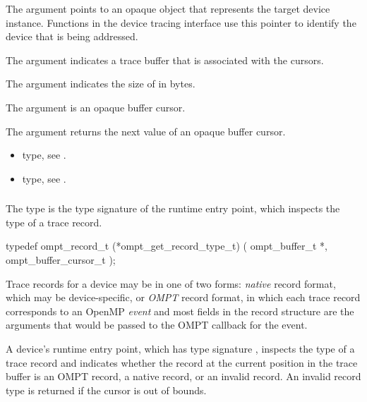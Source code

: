 \argdesc
The  argument points to an opaque object that represents
the target device instance. Functions in the device tracing interface
use this pointer to identify the device that is being addressed.

The  argument indicates a trace buffer that is associated
with the cursors.

The argument  indicates the size of  in bytes.

The  argument is an opaque buffer cursor.

The  argument returns the next value of an opaque buffer cursor.

\crossreferences
\begin{itemize}
\item {} type, see .

\item {} type, see .
\end{itemize}



\subsubsection{}
\label{sec:ompt_get_record_type_t}

\summary
The  type is the type signature of the 
 runtime entry point, which inspects the 
type of a trace record.

\format
\begin{ccppspecific}
\begin{omptInquiry}
typedef ompt_record_t (*ompt_get_record_type_t) (
  ompt_buffer_t *,
  ompt_buffer_cursor_t 
);
\end{omptInquiry}
\end{ccppspecific}

\descr
Trace records for a device may be in one of two forms: \emph{native} 
record format, which may be device-specific, or \emph{OMPT} record 
format, in which each trace record corresponds to an OpenMP \emph{event} 
and most fields in the record structure are the arguments that would 
be passed to the OMPT callback for the event.

A device's  runtime entry point, which has
type signature , inspects the type of a 
trace record and indicates whether the record at the current position 
in the trace buffer is an OMPT record, a native record, or an invalid 
record. An invalid record type is returned if the cursor is out of bounds.

